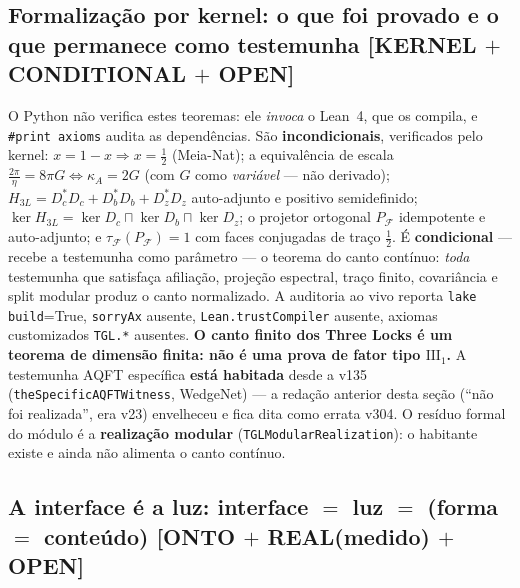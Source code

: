 \documentclass[11pt]{article}
\theoremstyle{definition}\newtheorem{deriv}{Derivação}
\begin{document}
\subsection*{Formalização por kernel: o que foi provado e o que permanece como testemunha \textsf{[KERNEL $+$ CONDITIONAL $+$ OPEN]}}

O Python não verifica estes teoremas: ele \emph{invoca} o Lean~4, que os compila, e \texttt{\#print axioms} audita as dependências. São \textbf{incondicionais}, verificados pelo kernel: $x=1-x\Rightarrow x=\tfrac12$ (Meia-Nat); a equivalência de escala $\tfrac{2\pi}{\eta}=8\pi G\iff\kappa_A=2G$ (com $G$ como \emph{variável} --- não derivado); $H_{3L}=D_c^{*}D_c+D_b^{*}D_b+D_z^{*}D_z$ auto-adjunto e positivo semidefinido; $\ker H_{3L}=\ker D_c\sqcap\ker D_b\sqcap\ker D_z$; o projetor ortogonal $P_{\mathcal F}$ idempotente e auto-adjunto; e $\tau_{\mathcal F}(P_{\mathcal F})=1$ com faces conjugadas de traço $\tfrac12$. É \textbf{condicional} --- recebe a testemunha como parâmetro --- o teorema do canto contínuo: \emph{toda} testemunha que satisfaça afiliação, projeção espectral, traço finito, covariância e split modular produz o canto normalizado. A auditoria ao vivo reporta \texttt{lake build}=True, \texttt{sorryAx} ausente, \texttt{Lean.trustCompiler} ausente, axiomas customizados \texttt{TGL.*} ausentes. \textbf{O canto finito dos Three Locks é um teorema de dimensão finita: não é uma prova de fator tipo $\mathrm{III}_1$.} A testemunha AQFT específica \textbf{está habitada} desde a v135 (\texttt{theSpecificAQFTWitness}, WedgeNet) --- a redação anterior desta seção (``não foi realizada'', era v23) envelheceu e fica dita como errata v304. O resíduo formal do módulo é a \textbf{realização modular} (\texttt{TGLModularRealization}): o habitante existe e ainda não alimenta o canto contínuo.

\subsection*{A interface é a luz: interface $=$ luz $=$ (forma $=$ conteúdo) \textsf{[ONTO $+$ REAL(medido) $+$ OPEN]}}
\end{document}
